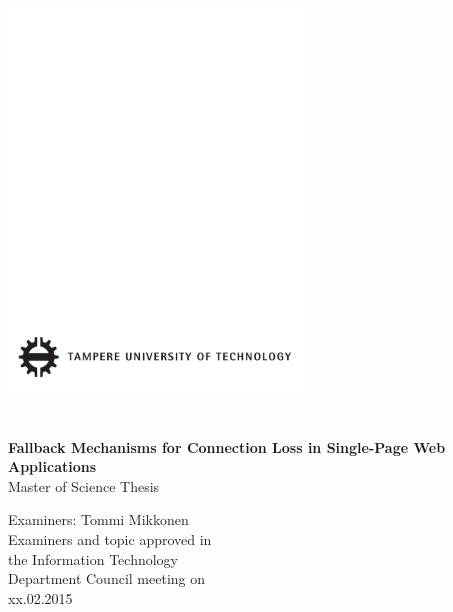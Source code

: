 \thispagestyle{empty}
 
\vspace*{-.5cm}\noindent
 
\includegraphics[width=8cm]{assets/tut-logo}
 
\vspace{6.8cm}
 
\\
{\bf\large \textsf{Fallback Mechanisms for Connection Loss in Single-Page Web Applications}}\\
\textsf{Master of Science Thesis}
 
\vspace{6.7cm} %
 
\begin{flushright}
  
\begin{minipage}[c]{6.8cm}
\begin{spacing}{1.0}
\textsf{Examiners: Tommi Mikkonen}\\
\textsf{Examiners and topic approved in}\\ 
\textsf{the Information Technology}\\
\textsf{Department Council meeting on}\\
\textsf{xx.02.2015}\\
\end{spacing}
\end{minipage}
\end{flushright}



